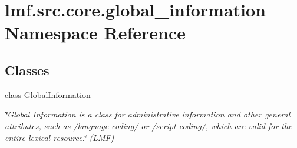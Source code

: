 \hypertarget{namespacelmf_1_1src_1_1core_1_1global__information}{\section{lmf.\+src.\+core.\+global\+\_\+information Namespace Reference}
\label{namespacelmf_1_1src_1_1core_1_1global__information}
}
\subsection*{Classes}
\begin{DoxyCompactItemize}
\item 
class \hyperlink{classlmf_1_1src_1_1core_1_1global__information_1_1_global_information}{Global\+Information}
\begin{DoxyCompactList}\small\item\em \char`\"{}\+Global Information is a class for administrative information and other general attributes, such as /language coding/ or /script coding/, which are valid for the entire lexical resource.\char`\"{} (L\+M\+F) \end{DoxyCompactList}\end{DoxyCompactItemize}
